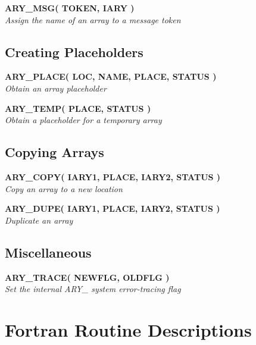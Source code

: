 \documentclass[twoside,11pt,nolof]{starlink}
\providecommand{\noteroutine}[2]{\textbf{#1}\hspace*{\fill}\nopagebreak \\
                             \hspace*{3em}\emph{#2}\hspace*{\fill}\par}
\begin{document}
\noteroutine{ARY\_MSG( TOKEN, IARY )}
            {Assign the name of an array to a message token}


\subsection{Creating Placeholders}
\label{creating_placeholders}

\noteroutine{ARY\_PLACE( LOC, NAME, PLACE, STATUS )}
            {Obtain an array placeholder}
\noteroutine{ARY\_TEMP( PLACE, STATUS )}
            {Obtain a placeholder for a temporary array}


\subsection{Copying Arrays}
\label{copying_arrays}

\noteroutine{ARY\_COPY( IARY1, PLACE, IARY2, STATUS )}
            {Copy an array to a new location}
\noteroutine{ARY\_DUPE( IARY1, PLACE, IARY2, STATUS )}
            {Duplicate an array}


\subsection{Miscellaneous}
\label{miscellaneous}

\noteroutine{ARY\_TRACE( NEWFLG, OLDFLG )}
            {Set the internal ARY\_ system error-tracing flag}

\newpage
\section{Fortran Routine Descriptions}
\label{fortran_routine_descriptions}
\label{ss:fortranroutinedescriptions}
\end{document}
